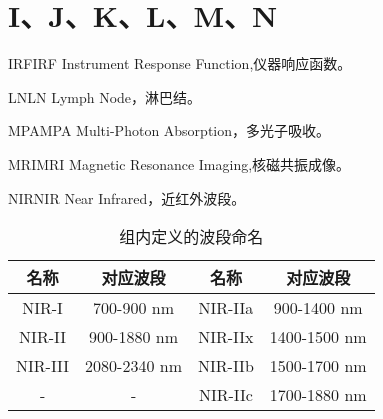 \documentclass[cn,11pt,chinese]{elegantbook}
\begin{document}
\section{I、J、K、L、M、N}

\begin{theorem}{IRF}{IRF} 
  Instrument Response Function,仪器响应函数。
\end{theorem}

\begin{theorem}{LN}{LN} 
  Lymph Node，淋巴结。
   \end{theorem}

\begin{theorem}{MPA}{MPA} 
Multi-Photon Absorption，多光子吸收。
 \end{theorem}

 \begin{theorem}{MRI}{MRI} 
  Magnetic Resonance Imaging,核磁共振成像。
   \end{theorem}

\begin{theorem}{NIR}{NIR} 
 Near Infrared，近红外波段。
\end{theorem}

\begin{table}[!htb]
  \centering
  \caption{组内定义的波段命名}
    \begin{tabular}{cc||cc}
    \hline
    \textbf{名称} & \textbf{对应波段} & \textbf{名称} & \textbf{对应波段}  \\
    \hline
    NIR-I  & 700-900 nm & NIR-IIa & 900-1400 nm     \\  
    NIR-II  & 900-1880 nm & NIR-IIx & 1400-1500 nm     \\  
    NIR-III  & 2080-2340 nm & NIR-IIb & 1500-1700 nm     \\  
    -  & - & NIR-IIc & 1700-1880 nm     \\  
    \hline
    \end{tabular}%
  \label{tab:NIR}%
\end{table}%
\end{document}

